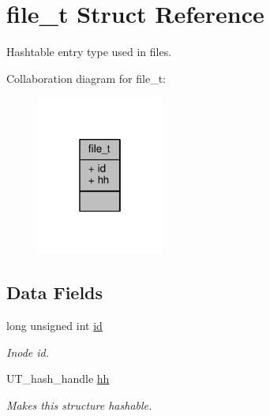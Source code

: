 \hypertarget{structfile__t}{}\section{file\+\_\+t Struct Reference}
\label{structfile__t}


Hashtable entry type used in {\ttfamily files}.  




Collaboration diagram for file\+\_\+t\+:\nopagebreak
\begin{figure}[H]
\begin{center}
\leavevmode
\includegraphics[width=118pt]{structfile__t__coll__graph}
\end{center}
\end{figure}
\subsection*{Data Fields}
\begin{DoxyCompactItemize}
\item 
long unsigned int \hyperlink{structfile__t_a44a772348760d7ca8095f707f652498a}{id}\hypertarget{structfile__t_a44a772348760d7ca8095f707f652498a}{}\label{structfile__t_a44a772348760d7ca8095f707f652498a}

\begin{DoxyCompactList}\small\item\em Inode id. \end{DoxyCompactList}\item 
U\+T\+\_\+hash\+\_\+handle \hyperlink{structfile__t_a67d3d81a4f9a9622b0befade8d131661}{hh}\hypertarget{structfile__t_a67d3d81a4f9a9622b0befade8d131661}{}\label{structfile__t_a67d3d81a4f9a9622b0befade8d131661}

\begin{DoxyCompactList}\small\item\em Makes this structure hashable. \end{DoxyCompactList}\end{DoxyCompactItemize}


